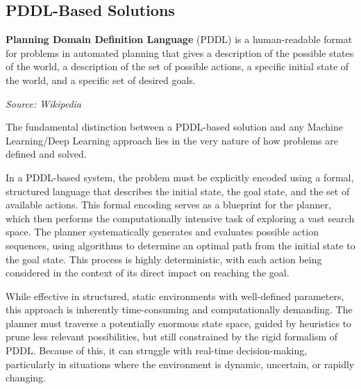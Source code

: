 \subsection{PDDL-Based Solutions}
\label{sub:pddl_based_solutions}
\begin{blockquote}
  \textbf{Planning Domain Definition Language} (PDDL) is a human-readable format
  for problems in automated planning that gives a description of the possible
  states of the world, a description of the set of possible actions, a specific
  initial state of the world, and a specific set of desired goals.

  \emph{Source: Wikipedia\footnotemark}
\end{blockquote}

The fundamental distinction between a PDDL-based solution and any Machine
Learning/Deep Learning approach lies in the very nature of how problems are
defined and solved.

In a PDDL-based system, the problem must be explicitly encoded using a formal,
structured language that describes the initial state, the goal state, and the
set of available actions. This formal encoding serves as a blueprint for the planner,
which then performs the computationally intensive task of exploring a vast
search space. The planner systematically generates and evaluates possible action
sequences, using algorithms to determine an optimal path from the initial state
to the goal state. This process is highly deterministic, with each action being
considered in the context of its direct impact on reaching the goal.

While effective in structured, static environments with well-defined parameters,
this approach is inherently time-consuming and computationally demanding. The planner
must traverse a potentially enormous state space, guided by heuristics to prune
less relevant possibilities, but still constrained by the rigid formalism of PDDL.
Because of this, it can struggle with real-time decision-making, particularly in
situations where the environment is dynamic, uncertain, or rapidly changing.

